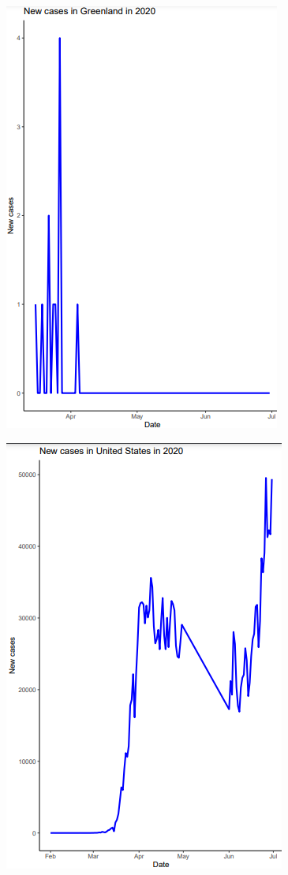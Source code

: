 \documentclass[a4paper]{article}
\theoremstyle{definition}
\begin{document}
\begin{enumerate}[i)]
\begin{enumerate}[1]
\begin{figure}[H]
				    \includegraphics[scale=0.8]{images/5.1.1.png}
		    	\end{figure}
		    	\begin{figure}[H]
				    \centering
				    \includegraphics[scale=0.8]{images/5.1.2.png}

\end{figure}
\end{enumerate}
\end{enumerate}
\end{document}
